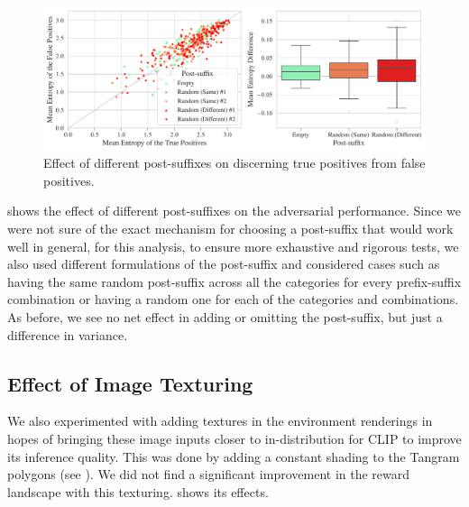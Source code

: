 \begin{figure}[H]
    \centering
    \includegraphics[width=\textwidth]{images/post-suffix_adversarial_2.pdf}
    \caption{Effect of different post-suffixes on discerning true positives from false positives.}
    \label{fig:post-suffix-adversarial}
\end{figure}

 shows the effect of different post-suffixes on the adversarial performance.
Since we were not sure of the exact mechanism for choosing a post-suffix that would work well in general, for this analysis, to ensure more exhaustive and rigorous tests, we also used different formulations of the post-suffix and considered cases such as having the same random post-suffix across all the categories for every prefix-suffix combination or having a random one for each of the categories and combinations.
As before, we see no net effect in adding or omitting the post-suffix, but just a difference in variance.


\subsection{Effect of Image Texturing}
\label{sec:image-texturing}
We also experimented with adding textures in the environment renderings
in hopes of bringing these image inputs closer to in-distribution for CLIP to improve its inference quality.
This was done by adding a constant shading to the Tangram polygons (see ).
We did not find a significant improvement in the reward landscape with this texturing.
 shows its effects.

